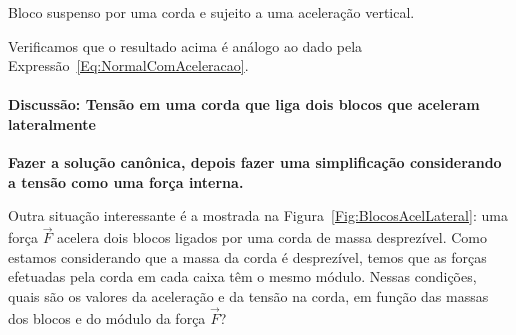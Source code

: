 \begin{marginfigure}[-3cm]
\centering
{}
\caption{Bloco suspenso por uma corda e sujeito a uma aceleração vertical. \label{Fig:TensaoBlocoAcelVertical}}
\end{marginfigure}

\noindent{}Verificamos que o resultado acima é análogo ao dado pela Expressão~\eqref{Eq:NormalComAceleracao}.

\paragraph{Discussão: Tensão em uma corda que liga dois blocos que aceleram lateralmente}

\textbf{Fazer a solução canônica, depois fazer uma simplificação considerando a tensão como uma força interna.}

Outra situação interessante é a mostrada na Figura~\ref{Fig:BlocosAcelLateral}: uma força $\vec{F}$ acelera dois blocos ligados por uma corda de massa desprezível. Como estamos considerando que a massa da corda é desprezível, temos que as forças efetuadas pela corda em cada caixa têm o mesmo módulo. Nessas condições, quais são os valores da aceleração e da tensão na corda, em função das massas dos blocos e do módulo da força $\vec{F}$?

